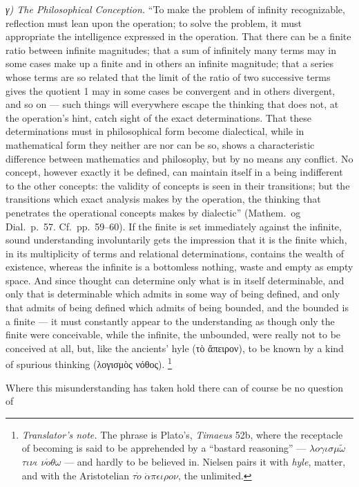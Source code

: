 \documentclass[12pt,a4paper]{book}
\renewcommand{\thefootnote}{\ifcase\value{footnote}\or *)\or **)\or ***)\fi}
\newcommand{\tnote}[1]{%
  \begingroup
  \renewcommand{\thefootnote}{\textdagger}%
  \footnote{\emph{Translator's note.} #1}%
  \addtocounter{footnote}{-1}%
  \endgroup}
\begin{document}
\emph{γ) The Philosophical Conception.} ``To make the problem of infinity
recognizable, reflection must lean upon the operation; to solve the problem, it
must appropriate the intelligence expressed in the operation. That there can be
a finite ratio between infinite magnitudes; that a sum of infinitely many terms
may in some cases make up a finite and
in others an infinite magnitude; that a series whose terms are so related that
the limit of the ratio of two successive terms gives the quotient 1 may in some
cases be convergent and in others divergent, and so on --- such things will
everywhere escape the thinking that does not, at the operation's hint, catch
sight of the exact determinations. That these determinations must in
philosophical form become dialectical, while in mathematical form they neither
are nor can be so, shows a characteristic difference between mathematics and
philosophy, but by no means any conflict. No concept, however exactly it be
defined, can maintain itself in a being indifferent to the other concepts: the
validity of concepts is seen in their transitions; but the transitions which
exact analysis makes by the operation, the thinking that penetrates the
operational concepts makes by dialectic'' (Mathem.\ og Dial.\ p.~57. Cf.\
pp.~59--60). If the finite is set immediately against the infinite, sound
understanding involuntarily gets the impression that it is the finite which, in
its multiplicity of terms and relational determinations, contains the wealth of
existence, whereas the infinite is a bottomless nothing, waste and empty as
empty space. And since thought can determine only what is in itself
determinable, and only that is determinable which admits in some way of being
defined, and only that admits of being defined which admits of being bounded,
and the bounded is a finite --- it must constantly appear to the understanding
as though only the finite were conceivable, while the infinite, the unbounded,
were really not to be conceived at all, but, like the ancients' hyle
(τὸ ἄπειρον), to be known by a kind of spurious thinking
(λογισμὸς νόθος).\tnote{The phrase is Plato's, \emph{Timaeus} 52b, where the
receptacle of becoming is said to be apprehended by a ``bastard reasoning'' ---
$\lambda o\gamma\iota\sigma\mu\tilde{\omega}$ $\tau\iota\nu\iota$
$\nu\acute{o}\theta\omega$ --- and hardly to be believed in. Nielsen pairs it
with \emph{hyle}, matter, and with the Aristotelian
$\tau\grave{o}$ $\ddot{\alpha}\pi\epsilon\iota\rho o\nu$, the unlimited.} Where
this misunderstanding has taken hold there can of course be no question of
\end{document}
